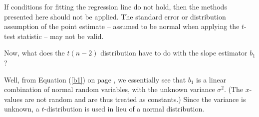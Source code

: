 
\begin{tipBox}{
If conditions for fitting the regression line do not hold, then the methods presented here should not be applied. The standard error or distribution assumption of the point estimate -- assumed to be normal when applying the $t$-test statistic -- may not be valid.}
\end{tipBox}



Now, what does the $t(n-2)$ distribution have to do with the slope estimator $b_1$?

Well, from Equation (\ref{b1}) on page \pageref{b1}, we essentially see that $b_1$ is a linear combination of normal random variables, with the unknown variance $\sigma^2$. (The $x$-values are not random and are thus treated as constants.) Since the variance is unknown, a $t$-distribution is used in lieu of a normal distribution.


